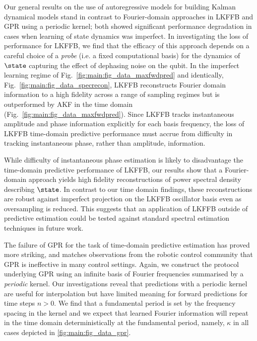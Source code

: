 {Our general results on the use of autoregressive models for building Kalman dynamical models stand in contrast to Fourier-domain approaches in LKFFB and GPR using a periodic kernel;  both showed significant performance degradation in cases when learning of state dynamics was imperfect.  In investigating the loss of performance for LKFFB, we find that the efficacy of this approach depends on a careful choice of a \textit{probe} (i.e. a fixed computational basis) for the dynamics of $\state$ capturing the effect of dephasing noise on the qubit.  In the imperfect learning regime of Fig.~\ref{fig:main:fig_data_maxfwdpred} and identically, Fig.~\ref{fig:main:fig_data_specrecon}, LKFFB reconstructs Fourier domain information to a high fidelity across a range of sampling regimes but is outperformed by AKF in the time domain (Fig.~\ref{fig:main:fig_data_maxfwdpred}). Since LKFFB tracks instantaneous amplitude and phase information explicitly for each basis frequency, the loss of LKFFB time-domain predictive performance must accrue from difficulty in tracking instantaneous phase, rather than amplitude, information. 

While difficulty of instantaneous phase estimation is likely to disadvantage the time-domain predictive performance of LKFFB, our results show that a Fourier-domain approach yields high fidelity reconstructions of power spectral density describing $\state$. In contrast to our time domain findings, these reconstructions are robust against imperfect projection on the LKFFB oscillator basis even as oversampling is reduced. This suggests that an application of LKFFB outside of predictive estimation could be tested against standard spectral estimation techniques in future work.

The failure of GPR for the task of time-domain predictive estimation has proved more striking, and matches observations from the robotic control community that GPR is ineffective in many control settings.  Again, we construct the protocol underlying GPR using an infinite basis of Fourier frequencies summarised by a \textit{periodic} kernel.  Our investigations reveal that predictions with a periodic kernel are useful for interpolation but have limited meaning for forward predictions for time steps $n >0$.  We find that a fundamental period is set by the frequency spacing in the kernel and we expect that learned Fourier information will repeat in the time domain deterministically at the fundamental period, namely, $\kappa$ in all cases depicted in \cref{fig:main:fig_data_gpr}. 

}
